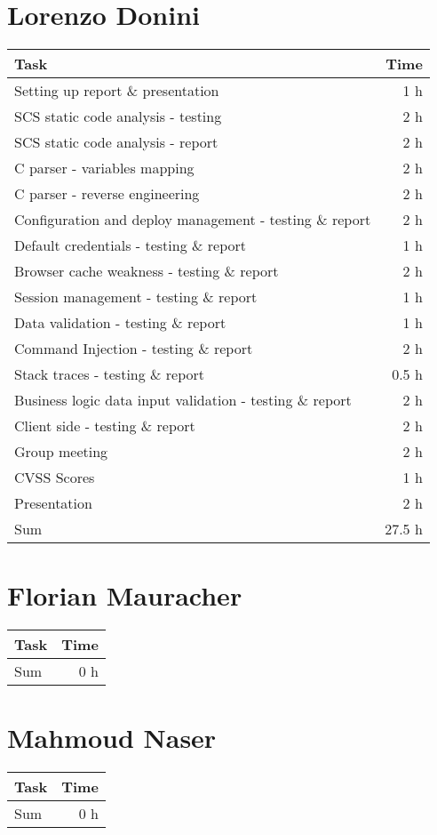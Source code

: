 \clearpage
\section*{Lorenzo Donini}
\begin{table}[h!tpb]
  \centering
  \begin{tabularx}{\textwidth}{X r}
    \toprule
      Task & Time \\
    \midrule
      Setting up report \& presentation & 1 h \\
      SCS static code analysis - testing & 2 h \\
      SCS static code analysis - report & 2 h \\
      C parser - variables mapping & 2 h \\
      C parser - reverse engineering & 2 h \\
      Configuration and deploy management - testing \& report & 2 h \\
      Default credentials - testing \& report & 1 h \\
      Browser cache weakness - testing \& report & 2 h \\
      Session management - testing \& report & 1 h \\
      Data validation - testing \& report & 1 h \\
      Command Injection - testing \& report & 2 h \\
      Stack traces - testing \& report & 0.5 h \\
      Business logic data input validation - testing \& report & 2 h \\
      Client side - testing \& report & 2 h \\
      Group meeting & 2 h \\
      CVSS Scores & 1 h \\
      Presentation & 2 h \\
    \midrule
      Sum & 27.5 h \\
    \bottomrule
  \end{tabularx}
\end{table}

\clearpage
\section*{Florian Mauracher}
\begin{table}[h!tpb]
  \centering
  \begin{tabularx}{\textwidth}{X r}
    \toprule
      Task & Time \\
    \midrule
    \midrule
      Sum & 0 h \\
    \bottomrule
  \end{tabularx}
\end{table}

\clearpage
\section*{Mahmoud Naser}
\begin{table}[h!tpb]
  \centering
  \begin{tabularx}{\textwidth}{X r}
    \toprule
      Task & Time \\
    \midrule
    \midrule
      Sum & 0 h \\
    \bottomrule
  \end{tabularx}
\end{table}
